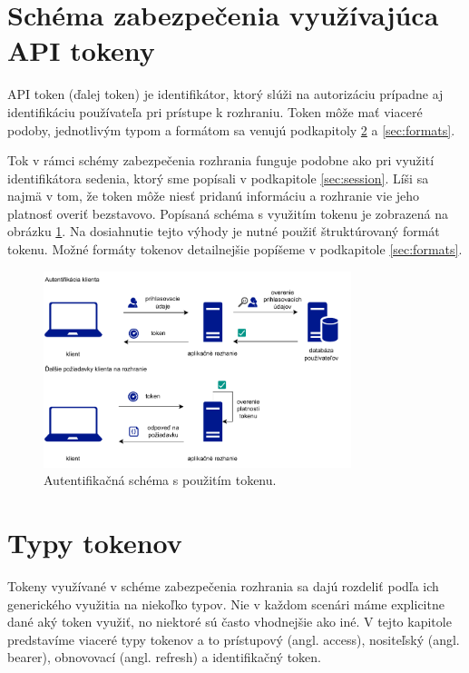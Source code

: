 \section{Schéma zabezpečenia využívajúca API tokeny}

API token (ďalej token) je identifikátor, ktorý slúži na autorizáciu prípadne aj identifikáciu používateľa pri prístupe k rozhraniu. Token môže mať viaceré podoby, jednotlivým typom a formátom sa venujú podkapitoly \ref{sec:types} a \ref{sec:formats}.

Tok v rámci schémy zabezpečenia rozhrania funguje podobne ako pri využití identifikátora sedenia, ktorý sme popísali v podkapitole \ref{sec:session}. Líši sa najmä v tom, že token môže niesť pridanú informáciu a rozhranie vie jeho platnosť overiť bezstavovo. Popísaná schéma s využitím tokenu je zobrazená na obrázku \ref{obr:token}. Na dosiahnutie tejto výhody je nutné použiť štruktúrovaný formát tokenu. Možné formáty tokenov detailnejšie popíšeme v podkapitole \ref{sec:formats}.


\begin{figure}
    \centerline{\includegraphics[width=0.8\textwidth]{images/token_schema}}
    \caption[Schéma s použitím tokenu]{Autentifikačná schéma s použitím tokenu.}
    \label{obr:token}
\end{figure}

\section{Typy tokenov}
\label{sec:types}

Tokeny využívané v schéme zabezpečenia rozhrania sa dajú rozdeliť podľa ich generického využitia na niekoľko typov. Nie v každom scenári máme explicitne dané aký token využiť, no niektoré sú často vhodnejšie ako iné. V tejto kapitole predstavíme viaceré typy tokenov a to prístupový (angl. access), nositeľský (angl. bearer), obnovovací (angl. refresh) a identifikačný token.

